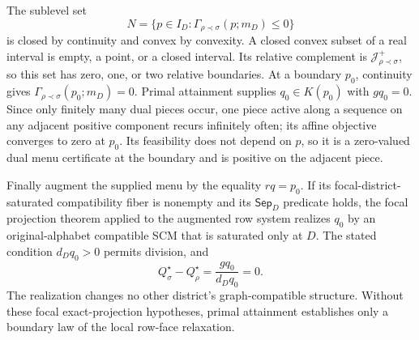 The sublevel set
\[
N=\{p\in I_D:\Gamma_{\rho\prec\sigma}(p;m_D)\leq0\}
\]
is closed by continuity and convex by convexity.  A closed convex subset of a real interval is empty, a point, or a closed interval.  Its relative complement is \(\mathcal J_{\rho\prec\sigma}^+\), so this set has zero, one, or two relative boundaries.  At a boundary \(p_0\), continuity gives \(\Gamma_{\rho\prec\sigma}(p_0;m_D)=0\).  Primal attainment supplies \(q_0\in K(p_0)\) with \(gq_0=0\).  Since only finitely many dual pieces occur, one piece active along a sequence on any adjacent positive component recurs infinitely often; its affine objective converges to zero at \(p_0\).  Its feasibility does not depend on \(p\), so it is a zero-valued dual menu certificate at the boundary and is positive on the adjacent piece.

Finally augment the supplied menu by the equality \(rq=p_0\).  If its focal-district-saturated compatibility fiber is nonempty and its \(\mathsf{Sep}_D\) predicate holds, the focal projection theorem applied to the augmented row system realizes \(q_0\) by an original-alphabet compatible SCM that is saturated only at \(D\).  The stated condition \(d_Dq_0>0\) permits division, and
\[
Q_\sigma^\star-Q_\rho^\star=\frac{gq_0}{d_Dq_0}=0.
\]
The realization changes no other district's graph-compatible structure.  Without these focal exact-projection hypotheses, primal attainment establishes only a boundary law of the local row-face relaxation.